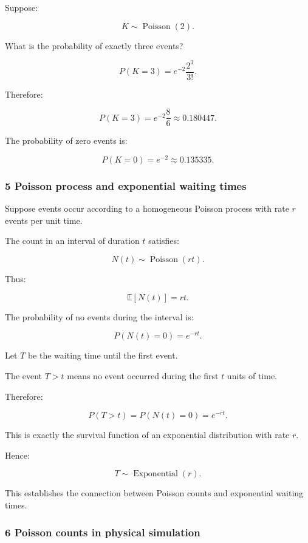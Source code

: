 \hypertarget{02-foundations-ii-ch024-numerical-example-poisson-event-counts}{}

Suppose:

\[
 K\sim\operatorname{Poisson}(2).
\]

What is the probability of exactly three events?

\[
 P(K=3) = e^{-2}\frac{2^3}{3!}.
\]

Therefore:

\[
 P(K=3)= e^{-2}\frac86 \approx\boxed{0.180447}.
\]

The probability of zero events is:

\[
 P(K=0)=e^{-2}\approx0.135335.
\]

\subsubsection{5 Poisson process and exponential waiting times}\label{02-foundations-ii-ch024-poisson-process-and-exponential-waiting-times}

\hypertarget{02-foundations-ii-ch024-poisson-process-and-exponential-waiting-times}{}

Suppose events occur according to a homogeneous Poisson process with rate \(r\) events per unit time.

The count in an interval of duration \(t\) satisfies:

\[
 \boxed{ N(t)\sim\operatorname{Poisson}(rt) }.
\]

Thus:

\[
 \mathbb E[N(t)]=rt.
\]

The probability of no events during the interval is:

\[
 P(N(t)=0)=e^{-rt}.
\]

Let \(T\) be the waiting time until the first event.

The event \(T>t\) means no event occurred during the first \(t\) units of time.

Therefore:

\[
 P(T>t)=P(N(t)=0)=e^{-rt}.
\]

This is exactly the survival function of an exponential distribution with rate \(r\).

Hence:

\[
 \boxed{ T\sim\operatorname{Exponential}(r) }.
\]

This establishes the connection between Poisson counts and exponential waiting times.

\subsubsection{6 Poisson counts in physical simulation}\label{02-foundations-ii-ch024-poisson-counts-in-physical-simulation}

